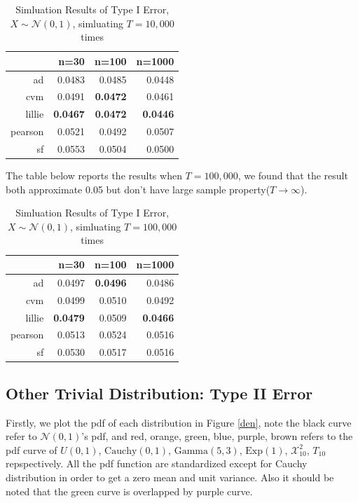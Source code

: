 \documentclass[twoside]{article}
\begin{document}
\begin{table}[ht]
\centering
\begin{tabular}{rrrr}
  \hline
 & n=30 & n=100 & n=1000 \\ 
  \hline
ad & 0.0483 & 0.0485 & 0.0448 \\ 
  cvm & 0.0491 & \textbf{0.0472} & 0.0461 \\ 
  lillie & \textbf{0.0467} & \textbf{0.0472} & \textbf{0.0446} \\ 
  pearson & 0.0521 & 0.0492 & 0.0507 \\ 
  sf & 0.0553 & 0.0504 & 0.0500 \\ 
   \hline
\end{tabular}
\caption{Simluation Results of Type I Error, $X\sim\mathcal{N}(0,1)$, simluating $T=10,000$ times}
\end{table}

The table below reports the results when $T=100,000$, we found that the result both approximate 0.05 but don't have large sample property($T\to\infty$).

\begin{table}[ht]
\centering
\begin{tabular}{rrrr}
  \hline
 & n=30 & n=100 & n=1000 \\ 
  \hline
ad & 0.0497 & \textbf{0.0496} & 0.0486 \\ 
  cvm & 0.0499 & 0.0510 & 0.0492 \\ 
  lillie & \textbf{0.0479} & 0.0509 & \textbf{0.0466} \\ 
  pearson & 0.0513 & 0.0524 & 0.0516 \\ 
  sf & 0.0530 & 0.0517 & 0.0516 \\ 
   \hline
\end{tabular}
\caption{Simluation Results of Type I Error, $X\sim\mathcal{N}(0,1)$, simluating $T=100,000$ times}
\end{table}

\subsection{Other Trivial Distribution: Type II Error}

Firstly, we plot the pdf of each distribution in Figure \ref{den}, note the black curve refer to $\mathcal{N}(0,1)$'s pdf, and red, orange, green, blue, purple, brown refers to the pdf curve of $U(0,1)$, $\mathrm{Cauchy}(0,1)$, $\mathrm{Gamma}(5, 3)$, $\mathrm{Exp}(1)$, $\mathcal{X}^2_{10}$, $T_{10}$ repspectively. All the pdf function are standardized except for Cauchy distribution in order to get a zero mean and unit variance. Also it should be noted that the green curve is overlapped by purple curve.
\end{document}
